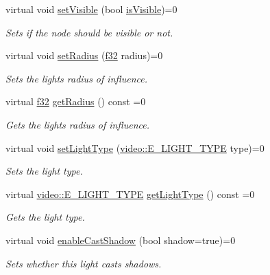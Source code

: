 \begin{DoxyCompactItemize}
virtual void \hyperlink{classirr_1_1scene_1_1ILightSceneNode_a3a6a6681a665ec4c214cda8a84a29337}{set\+Visible} (bool \hyperlink{classirr_1_1scene_1_1ISceneNode_a9e8e4e8be0055e8182eb26b055abf339}{is\+Visible})=0
\begin{DoxyCompactList}\small\item\em Sets if the node should be visible or not. \end{DoxyCompactList}\item 
virtual void \hyperlink{classirr_1_1scene_1_1ILightSceneNode_a7da64c8c4776988a39927827f2c3f364}{set\+Radius} (\hyperlink{namespaceirr_a0277be98d67dc26ff93b1a6a1d086b07}{f32} radius)=0
\begin{DoxyCompactList}\small\item\em Sets the light\textquotesingle{}s radius of influence. \end{DoxyCompactList}\item 
virtual \hyperlink{namespaceirr_a0277be98d67dc26ff93b1a6a1d086b07}{f32} \hyperlink{classirr_1_1scene_1_1ILightSceneNode_a4ce3cd789ed3adabd381ff7f915861a0}{get\+Radius} () const =0
\begin{DoxyCompactList}\small\item\em Gets the light\textquotesingle{}s radius of influence. \end{DoxyCompactList}\item 
virtual void \hyperlink{classirr_1_1scene_1_1ILightSceneNode_a18b3c0ba831bdc9166db341a35701c9b}{set\+Light\+Type} (\hyperlink{namespaceirr_1_1video_aaf0e02f6f83cc35cf9e764bf18400d39}{video\+::\+E\+\_\+\+L\+I\+G\+H\+T\+\_\+\+T\+Y\+PE} type)=0
\begin{DoxyCompactList}\small\item\em Sets the light type. \end{DoxyCompactList}\item 
virtual \hyperlink{namespaceirr_1_1video_aaf0e02f6f83cc35cf9e764bf18400d39}{video\+::\+E\+\_\+\+L\+I\+G\+H\+T\+\_\+\+T\+Y\+PE} \hyperlink{classirr_1_1scene_1_1ILightSceneNode_a47e327388c75391ebc910369af7eedce}{get\+Light\+Type} () const =0
\begin{DoxyCompactList}\small\item\em Gets the light type. \end{DoxyCompactList}\item 
virtual void \hyperlink{classirr_1_1scene_1_1ILightSceneNode_a1520d051fe04bc8c5c8975fb3908161b}{enable\+Cast\+Shadow} (bool shadow=true)=0
\begin{DoxyCompactList}\small\item\em Sets whether this light casts shadows. \end{DoxyCompactList}\item 

\end{DoxyCompactItemize}
